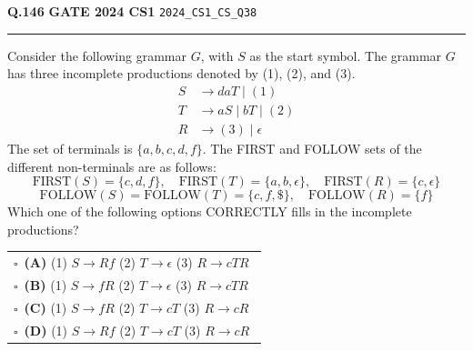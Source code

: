 \documentclass[a4paper,10pt]{article}
\begin{document}
\begin{tcolorbox}[
    blanker,
    sidebyside,
    sidebyside align=top,
    lefthand width=0.55\textwidth,
    top=4pt, bottom=4pt, left=0pt, right=0pt,
    middle=16pt,
    underlay={
        \draw[dashed, black!80, line width=0.8pt, dash pattern=on 4pt off 3pt]
            ([xshift=0.55\textwidth+8pt]frame.north west) --
            ([xshift=0.55\textwidth+8pt]frame.south west);
    }
]
\textbf{Q.146}  \hfill {\footnotesize\textbf{GATE 2024 CS1} \quad \tiny\texttt{2024\_CS1\_CS\_Q38}}
\vspace{2pt}\hrule height 0.3pt\vspace{4pt}

Consider the following grammar $G$, with $S$ as the start symbol. The grammar $G$ has three incomplete productions denoted by (1), (2), and (3).
\begin{align*}
S &\to daT \mid (1) \\
T &\to aS \mid bT \mid (2) \\
R &\to (3) \mid \epsilon
\end{align*}
The set of terminals is $\{a, b, c, d, f\}$. The FIRST and FOLLOW sets of the different non-terminals are as follows:
$$\text{FIRST}(S) = \{c, d, f\}, \quad \text{FIRST}(T) = \{a, b, \epsilon\}, \quad \text{FIRST}(R) = \{c, \epsilon\}$$
$$\text{FOLLOW}(S) = \text{FOLLOW}(T) = \{c, f, \$\}, \quad \text{FOLLOW}(R) = \{f\}$$
Which one of the following options CORRECTLY fills in the incomplete productions?

\par\vspace{6pt}\noindent
\begin{tabular}{@{}p{0.98\linewidth}@{}}
$\square$\ \textbf{(A)} (1) $S \to Rf$ (2) $T \to \epsilon$ (3) $R \to cTR$ \\
\addlinespace[3pt]
$\square$\ \textbf{(B)} (1) $S \to fR$ (2) $T \to \epsilon$ (3) $R \to cTR$ \\
\addlinespace[3pt]
$\square$\ \textbf{(C)} (1) $S \to fR$ (2) $T \to cT$ (3) $R \to cR$ \\
\addlinespace[3pt]
$\square$\ \textbf{(D)} (1) $S \to Rf$ (2) $T \to cT$ (3) $R \to cR$
\end{tabular}

\tcblower


\end{tcolorbox}
\end{document}

